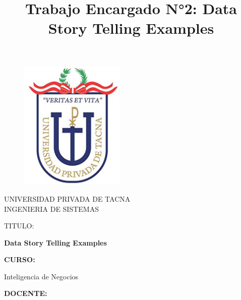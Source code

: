 \documentclass[twoside,twocolumn]{article}
\begin{document}
\title{Trabajo Encargado N°2: Data Story Telling Examples}

\begin{titlepage}
\begin{figure}[htb]
\begin{center}
\includegraphics[width=5cm]{imagenes/logo.png}
\end{center}
\end{figure}
\vspace*{-0.25in}
\begin{center}
\large{UNIVERSIDAD PRIVADA DE TACNA}\\
\vspace*{-0.025in}
INGENIERIA DE SISTEMAS  \\	

\vspace*{0.5in}
\begin{large}
TITULO:\\
\end{large}

\vspace*{0.1in}
\begin{Large}
\textbf{Data Story Telling Examples} \\
\end{Large}

\vspace*{0.3in}
\begin{Large}
\textbf{CURSO:} \\
\end{Large}

\vspace*{0.1in}
\begin{large}
Inteligencia de Negocios\\
\end{large}

\vspace*{0.3in}
\begin{Large}
\textbf{DOCENTE:} \\
\end{Large}


\end{center}
\end{titlepage}
\end{document}
